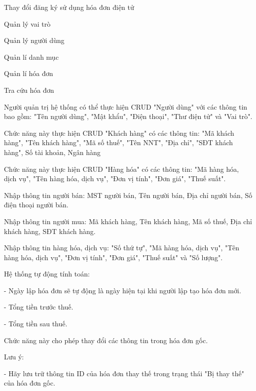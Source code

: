 Thay đổi đăng ký sử dụng hóa đơn điện tử

Quản lý vai trò

Quản lý người dùng

Quản lí danh mục

Quản lí hóa đơn

Tra cứu hóa đơn


Người quản trị hệ thống có thể thực hiện CRUD "Người dùng" với các thông tin bao gồm: "Tên người dùng", "Mật khẩu", "Điện thoại", "Thư điện tử" và "Vai trò".



Chức năng này thực hiện CRUD "Khách hàng" có các thông tin: "Mã khách hàng", "Tên khách hàng", "Mã số thuế", "Tên NNT", "Địa chỉ", "SĐT khách hàng", Số tài khoản, Ngân hàng


Chức năng này thực hiện CRUD "Hàng hóa" có các thông tin: "Mã hàng hóa, dịch vụ", "Tên hàng hóa, dịch vụ", "Đơn vị tính", "Đơn giá", "Thuế suất".



Nhập thông tin người bán: MST người bán, Tên người bán, Địa chỉ người bán, Số điện thoại người bán.

Nhập thông tin người mua: Mã khách hàng, Tên khách hàng, Mã số thuế, Địa chỉ khách hàng, SĐT khách hàng.

Nhập thông tin hàng hóa, dịch vụ: "Số thứ tự", "Mã hàng hóa, dịch vụ", "Tên hàng hóa, dịch vụ", "Đơn vị tính", "Đơn giá", "Thuế suất" và "Số lượng".

Hệ thống tự động tính toán:

- Ngày lập hóa đơn sẽ tự động là ngày hiện tại khi người lập tạo hóa đơn mới.

- Tổng tiền trước thuế.

- Tổng tiền sau thuế.


Chức năng này cho phép thay đổi các thông tin trong hóa đơn gốc.

Lưu ý:

- Hãy lưu trữ thông tin ID của hóa đơn thay thế trong trạng thái "Bị thay thế" của hóa đơn gốc.

